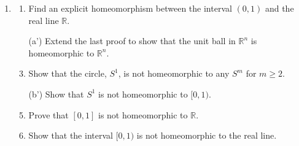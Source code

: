 \documentclass[notoc,notitlepage]{tufte-book}
\begin{document}
\begin{enumerate}
  \item 
    \begin{enumerate}
      \item Find an explicit homeomorphism between the interval $(0, 1)$ and the real line
        $\mathbb{R}$.
      \item[(a')] Extend the last proof to show that the unit ball in $\mathbb{R}^n$ is
        homeomorphic to $\mathbb{R}^n$.
      \item Show that the circle, $S^1$, is not homeomorphic to any $S^m$ for
        $m \geq 2$.
      \item[(b')] Show that $S^1$ is not homeomorphic to $[0, 1)$.
      \item Prove that $[0, 1]$ is not homeomorphic to $\mathbb{R}$.
      \item Show that the interval $[0, 1)$ is not homeomorphic to the real line.
    \end{enumerate}


\end{enumerate}
\end{document}
